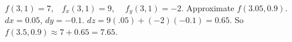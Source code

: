 {$f(3,1) = 7$,\ \  $f_x(3,1) = 9$, \ \ $f_y(3,1) = -2$.  Approximate $f(3.05, 0.9)$. 
}
{$dx = 0.05$, $dy = -0.1$. $dz = 9(.05)+(-2)(-0.1) = 0.65$. So $f(3.5,0.9) \approx 7+0.65=7.65$.
}